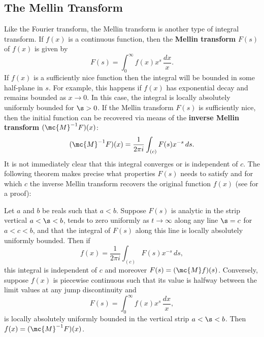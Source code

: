       \subsection*{The Mellin Transform}
        Like the Fourier transform, the Mellin transform is another type of integral transform. If $f(x)$ is a continuous function, then the \textbf{Mellin transform} $F(s)$ of $f(x)$ is given by
        \[
          F(s) = \int_{0}^{\infty}f(x)x^{s}\,\frac{dx}{x}.
        \]
        If $f(x)$ is a sufficiently nice function then the integral will be bounded in some half-plane in $s$. For example, this happens if $f(x)$ has exponential decay and remains bounded as $x \to 0$. In this case, the integral is locally absolutely uniformly bounded for $\s > 0$. If the Mellin transform $F(s)$ is sufficiently nice, then the initial function can be recovered via means of the \textbf{inverse Mellin transform} $(\mc{M}^{-1}F)(x)$:
        \[
          (\mc{M}^{-1}F)(x) = \frac{1}{2\pi i}\int_{(c)}F(s)x^{-s}\,ds.
        \]
        It is not immediately clear that this integral converges or is independent of $c$. The following theorem makes precise what properties $F(s)$ needs to satisfy and for which $c$ the inverse Mellin transform recovers the original function $f(x)$ (see \cite{debnath2002integral} for a proof):

        \begin{theorem}
          Let $a$ and $b$ be reals such that $a < b$. Suppose $F(s)$ is analytic in the strip vertical $a < \s < b$, tends to zero uniformly as $t \to \infty$ along any line $\s = c$ for $a < c < b$, and that the integral of $F(s)$ along this line is locally absolutely uniformly bounded. Then if
          \[
            f(x) = \frac{1}{2\pi i}\int_{(c)}F(s)x^{-s}\,ds,
          \]
          this integral is independent of $c$ and moreover $F(s) = (\mc{M}f)(s)$. Conversely, suppose $f(x)$ is piecewise continuous such that its value is halfway between the limit values at any jump discontinuity and
          \[
            F(s) = \int_{0}^{\infty}f(x)x^{s}\,\frac{dx}{x},
          \]
          is locally absolutely uniformly bounded in the vertical strip $a < \s < b$. Then $f(x) = (\mc{M}^{-1}F)(x)$.
        \end{theorem}
